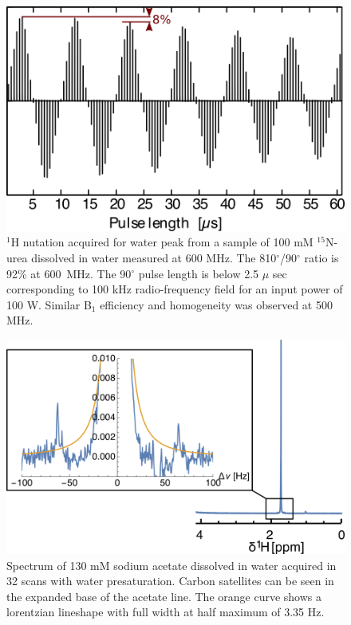 \documentclass[preprint,5p]{elsarticle}
\begin{document}
\cbstart
\begin{figure}
\centering
\includegraphics[width=.95\linewidth,keepaspectratio=true]{./figures/ms5n17-tlp-sp-150218-1-Hnutation-171216-103.png}
\caption{$^1$H nutation acquired for water peak from a sample of 100 mM $^{15}$N-urea dissolved in water measured at 600 MHz. The 810$^{\circ}$/90$^{\circ}$ ratio is 92\% at 600~MHz. The 90$^{\circ}$ pulse length is below 2.5 $\mu$ sec corresponding to 100 kHz radio-frequency field for an input power of 100 W. Similar B$_{1}$ efficiency and homogeneity was observed at 500 MHz.}
\label{fig:1H-nutation}
\end{figure}
\cbend


\begin{figure}
\centering
\includegraphics[width=.80\linewidth,keepaspectratio=true]{./figures/lineshape.png}
\caption{Spectrum of 130 mM sodium acetate dissolved in water acquired in 32 scans with water presaturation. Carbon satellites can be seen in the expanded base of the acetate line. The orange curve shows a lorentzian lineshape with full width at half maximum of 3.35 Hz.}
\label{fig:lineshape}
\end{figure}
\end{document}

